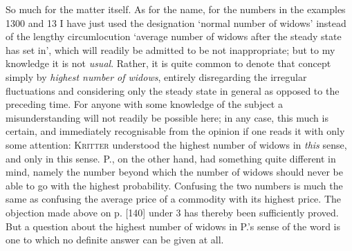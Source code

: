 So much for the matter itself. As for the name, for the numbers in the examples 1300 and 13 I have just used the designation ‘normal number of widows’ instead of the lengthy circumlocution ‘average number of widows after the steady state has set in’, which will readily be admitted to be not inappropriate; but to my knowledge it is not \textit{usual}. Rather, it is quite common to denote that concept simply by \textit{highest number of widows}, entirely disregarding the irregular fluctuations and considering only the steady state in general as opposed to the preceding time. For anyone with some knowledge of the subject a misunderstanding will not readily be possible here; in any case, this much is certain, and immediately recognisable from the opinion if one reads it with only some attention: \textsc{Kritter} understood the highest number of widows in \textit{this} sense, and only in this sense. P., on the other hand, had something quite different in mind, namely the number beyond which the number of widows should never be able to go with the highest probability. Confusing the two numbers is much the same as confusing the average price of a commodity with its highest price. The objection made above on p. [140] under 3 has thereby been sufficiently proved. But a question about the highest number of widows in P.'s sense of the word is one to which no definite answer can be given at all.
